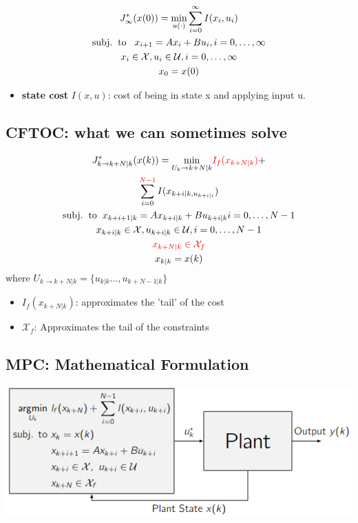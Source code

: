 \begin{gather*}
    J^*_\infty(x(0)) = \underset{u(\cdot)}{\mathrm{min}}\sum^\infty_{i=0}I(x_i,u_i) \\
    \mathrm{subj.\hspace{2mm} to} \hspace{3mm}x_{i+1} = Ax_i + B u_i, i = 0,\dots,\infty \\
    x_i \in \mathcal{X}, u_i \in \mathcal{U}, i = 0,\dots,\infty\\
    x_0 = x(0)
\end{gather*}

\begin{itemize}
    \item \textbf{state cost} $I(x,u)$: cost of being in state x and applying input u.
\end{itemize}
\subsection{CFTOC: what we can sometimes solve}
\begin{gather*}
    J^*_{k\rightarrow k+N|k}(x(k)) = \underset{U_k\rightarrow k+ N|k}{\mathrm{min}} \textcolor{red}{I_f(x_{k+N|k})}+ \\ \sum^{\textcolor{red}{N-1}}_{i=0}I(x_{k+i|k, u_{k+i|i}}) \\ 
    \mathrm{subj. \hspace{2mm} to \hspace{2mm}} x_{k+i+1|k}= Ax_{k+i|k} + Bu_{k+i|k} i = 0,\dots,N-1 \\
    x_{k+i|k} \in \mathcal{X}, u_{k+i|k} \in \mathcal{U}, i= 0,\dots,N-1 \\
    \textcolor{red}{x_{k+N|k} \in \mathcal{X}_f}\\
    x_{k|k} = x(k)
\end{gather*}
where $U_{k\rightarrow k + N|k}= \{u_{k|k}\dots,u_{k+N-1|k}\}$
\begin{itemize}
    \item $I_f(x_{k+N|k})$: approximates the 'tail' of the cost
    \item $\mathcal{X}_f$: Approximates the tail of the constraints 
\end{itemize}
\subsection{MPC: Mathematical Formulation}
\begin{center}
\includegraphics[width = 0.6\linewidth]{MPC_summary/Images/Screenshot from 2021-07-30 16-13-03.png}
\end{center}
